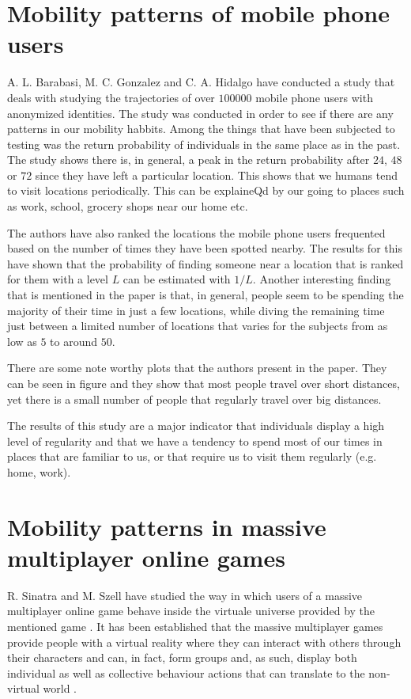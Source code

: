 \section{Mobility patterns of mobile phone users}
A. L. Barabasi, M. C. Gonzalez and C. A. Hidalgo have conducted a study
\cite{Barabasi08} that deals with studying the trajectories of over $100000$
mobile phone users with anonymized identities. The study was conducted in order
to see if there are any patterns in our mobility habbits. Among the things that
have been subjected to testing was the return probability of individuals in the
same place as in the past. The study shows there is, in general, a peak in the
return probability after $24$, $48$ or $72$ since they have left a particular
location. This shows that we humans tend to visit locations periodically. This
can be explaineQd by our going to places such as work, school, grocery shops
near our home etc.

The authors have also ranked the locations the mobile phone users frequented
based on the number of times they have been spotted nearby. The results for this
have shown that the probability of finding someone near a location that is
ranked for them with a level $L$ can be estimated with $1/L$. Another
interesting finding that is mentioned in the paper is that, in general, people
seem to be spending the majority of their time in just a few locations, while
diving the remaining time just between a limited number of locations that varies
for the subjects from as low as $5$ to around $50$.

There are some note worthy plots that the authors present in the paper. They can
be seen in figure{} and they show that most people travel over short distances,
yet there is a small number of people that regularly travel over big distances.

The results of this study are a major indicator that individuals display a high
level of regularity and that we have a tendency to spend most of our times in
places that are familiar to us, or that require us to visit them regularly (e.g.
home, work).

\section{Mobility patterns in massive multiplayer online games}
R. Sinatra and M. Szell have studied the way in which users of a massive
multiplayer online game behave inside the virtuale universe provided by the
mentioned game \cite{Sinatra14}. It has been established that the massive
multiplayer games provide people with a virtual reality where they can interact
with others through their characters and can, in fact, form groups and, as such,
display both individual as well as collective behaviour actions that can
translate to the non-virtual world \cite{Ball03}.

